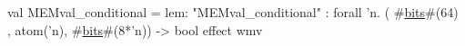 val MEMval_conditional = {lem: "MEMval_conditional"} : forall 'n.
  ( #\hyperref[zbits]{bits}#(64) , atom('n), #\hyperref[zbits]{bits}#(8*'n)) -> bool effect { wmv }
